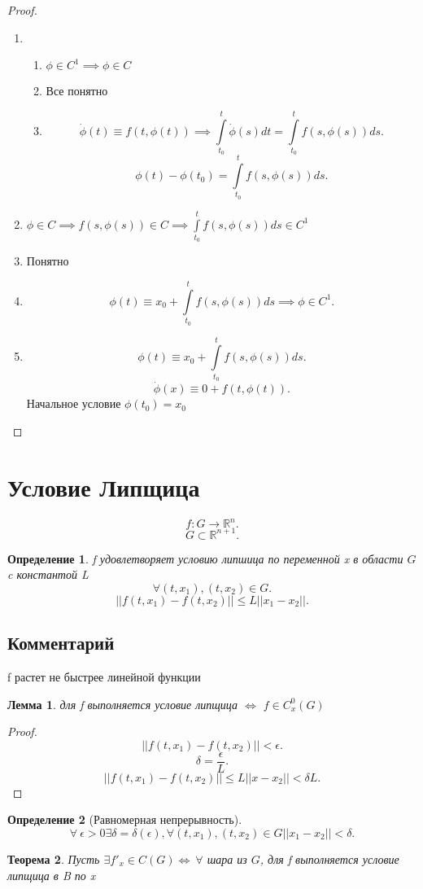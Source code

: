 \documentclass[14pt]{extarticle}
\newtheorem{theorem}{Теорема}
\newtheorem{definition}{Определение}
\newtheorem{lemma}[theorem]{Лемма}
\begin{document}
\begin{proof}
	\begin{enumerate}
		\item
		      \begin{enumerate}
			      \item $\phi \in C^{1} \implies \phi \in C$
			      \item Все понятно
			      \item
			            \[
				            \dot{\phi}(t) \equiv f(t,\phi(t)) \implies
				            \int\limits_{t_0}^{t} \dot{\phi}(s) dt = \int\limits_{t_0}^{t} f(s,\phi(s)) ds
				            .\]
			            \[
				            \phi(t) - \phi(t_0) = \int\limits_{t_0}^{t} f(s,\phi(s)) ds
				            .\]
		      \end{enumerate}
		\item
		      $\phi \in C \implies f(s,\phi(s)) \in C \implies \int\limits_{t_0}^{t} f(s,\phi(s)) ds \in C^{1}  $
		\item Понятно
		\item
		      \[
			      \phi(t) \equiv x_0 + \int\limits_{t_0}^{t} f(s,\phi(s)) ds \implies \phi \in C^{1}
			      .\]
        \item 
            \[
            \phi(t) \equiv x_0 + \int\limits_{t_0}^{t}   f(s,\phi(s)) ds
            .\] 
            \[
                \dot{\phi}(x)  \equiv 0 + f(t,\phi(t))
            .\] 
            Начальное условие $\phi(t_0) = x_0$
	\end{enumerate}
\end{proof}
\section{Условие Липщица}
\[
f : G \to \mathbb{R}^{n}
.\] 
\[
G \subset \mathbb{R}^{n+1}
.\] 
\begin{definition}
    f удовлетворяет условию липшица по переменной x в области $G$  c константой L
    \[
    \forall  (t,x_1),  (t,x_2) \in G
    .\] 
    \[
    ||f(t,x_1) - f(t,x_2)|| \le  L||x_1-x_2||
    .\] 
\end{definition}
\subsection{Комментарий}
f растет не быстрее линейной функции
\begin{lemma}
    для f выполняется условие липщица $\iff$  $f \in C^{0}_{x}(G)$
\end{lemma}
\begin{proof}
    \[
    ||f(t,x_1) - f(t,x_2)|| < \epsilon
    .\] 
    \[
    \delta = \frac{\epsilon}{L}
    .\] 
    \[
    ||f(t,x_1) - f(t,x_2)|| \le  L||x-x_2|| < \delta L
    .\] 
\end{proof}
\begin{definition}[Равномерная непрерывность]
    \[
    \forall  ~ \epsilon > 0 \exists  \delta =\delta(\epsilon), \forall  (t,x_1),(t,x_2) \in G ||x_1-x_2|| <\delta
    .\] 
\end{definition}
\begin{theorem}
    Пусть $\exists  f'_{x} \in C(G) \iff ~ \forall $ шара из $G$, для f выполняется условие липщица в B по x
\end{theorem}
\end{document}

